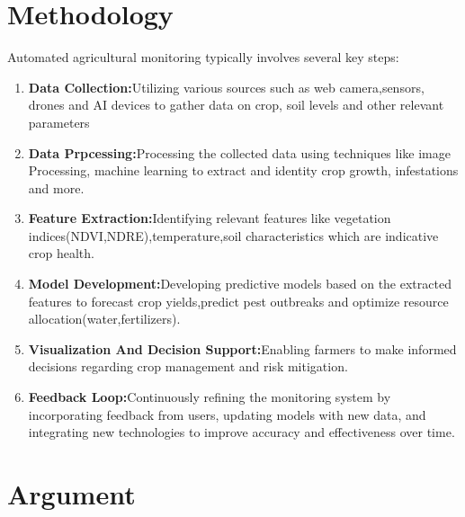 \documentclass{article}
\begin{document}
\section{Methodology}
Automated agricultural monitoring typically involves several key steps: 
\begin{enumerate}
    \item\textbf{ Data Collection:}\hspace{0.2cm}Utilizing various sources such as web camera,sensors, drones and AI devices to gather data on crop, soil levels and other relevant parameters
\item\textbf{ Data Prpcessing:}\hspace{0.2cm}Processing the collected data using techniques like image Processing, machine learning to extract and identity crop growth, infestations and more.
\item\textbf{ Feature Extraction:}\hspace{0.2cm}Identifying relevant features like vegetation indices(NDVI,NDRE),temperature,soil characteristics which are indicative crop health.
\item\textbf{Model Development:}Developing predictive models based on the extracted features to forecast crop yields,predict pest outbreaks and optimize resource allocation(water,fertilizers).
\item\textbf{ Visualization And Decision Support:}Enabling farmers to make informed decisions regarding crop management and risk mitigation.
\item\textbf{ Feedback Loop:}Continuously refining the monitoring system by incorporating feedback from users, updating models with new data, and integrating new technologies to improve accuracy and effectiveness over time.
\end{enumerate}
\section{Argument}
\end{document}

